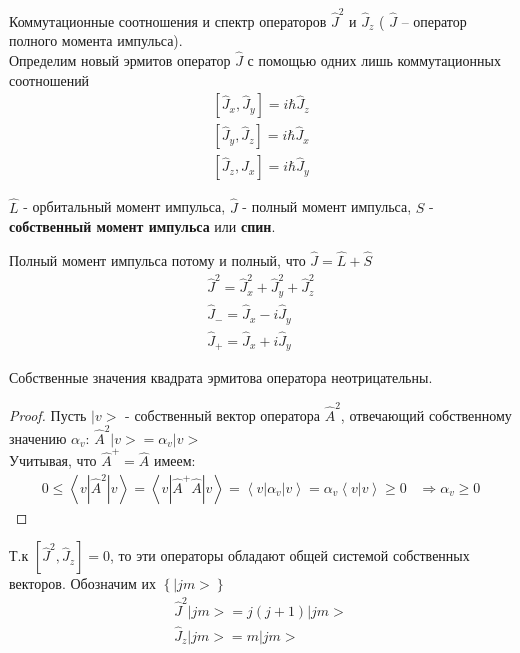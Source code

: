 \documentclass[__main__.tex]{subfiles}
\begin{document}
	
	Коммутационные соотношения и спектр операторов $\hat{J}^2$ и $\hat{J}_z$ ( $\hat{J}$ -- оператор полного момента импульса).\\ 
	
	Определим новый эрмитов оператор $\hat{J}$ с помощью одних лишь коммутационных соотношений
	\begin{gather*}
		\left[\hat{J}_x,\hat{J}_y\right] = i\hbar\hat{J}_z\\
		\left[\hat{J}_y,\hat{J}_z\right] = i\hbar\hat{J}_x\\
		\left[\hat{J}_z,\hat{J}_x\right] = i\hbar\hat{J}_y
	\end{gather*}
	\begin{definition}
		$\hat{L}$ -  орбитальный момент импульса, $\hat{J}$ - полный момент импульса, $\hat{S}$ - \textbf{собственный момент импульса} или \textbf{спин}.
	\end{definition}
	Полный момент импульса потому и полный, что $\hat{J} = \hat{L}+\hat{S}$
	\begin{gather*}
		\hat{J}^2 = \hat{J}^2_x+\hat{J}^2_y+\hat{J}^2_z\\
		\hat{J}_{-} = \hat{J}_x-i\hat{J}_y\\
		\hat{J}_{+} = \hat{J}_x+i\hat{J}_y
	\end{gather*}
	\begin{theorem}
		Собственные значения квадрата эрмитова оператора неотрицательны.
	\end{theorem}
	\begin{proof}
		Пусть $|v>$ - собственный вектор оператора $\hat{A}^2$, отвечающий собственному значению $\alpha_v$: $\hat{A}^2|v> = \alpha_v|v>$\\
		Учитывая, что $\hat{A}^{+} = \hat{A}$ имеем:
		\begin{gather*}
			0 \leq \left<v|\hat{A}^2|v\right> = \left<v|\hat{A}^{+}\hat{A}|v\right> = \left<v|\alpha_v|v\right> = \alpha_v\left<v|v\right> \geq 0\;\;\;\Rightarrow \alpha_v \geq 0
		\end{gather*} 
	\end{proof}
	Т.к $\left[\hat{J}^2,\hat{J}_z\right] = 0$, то эти операторы обладают общей системой собственных векторов. Обозначим их $\left\{|jm>\right\}$
	\begin{gather*}
		\hat{J}^2|jm> = j(j+1)|jm>\\
		\hat{J}_z|jm> = m|jm>
	\end{gather*} 
\end{document}
